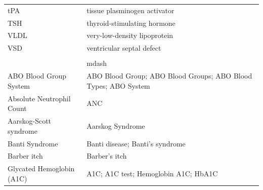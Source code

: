 \begin{longtable}{>{\raggedright\arraybackslash}p{} >{\raggedright\arraybackslash}p{}}
tPA & tissue plasminogen activator \\
TSH & thyroid-stimulating hormone \\
VLDL & very-low-density lipoprotein \\
VSD & ventricular septal defect\\\\&mdash \\
ABO Blood Group System & ABO Blood Group; ABO Blood Groups; ABO Blood Types; ABO System \\
Absolute Neutrophil Count & ANC \\
Aarskog-Scott syndrome & Aarskog Syndrome \\
Banti Syndrome & Banti disease; Banti's syndrome \\
Barber itch & Barber's itch \\
Glycated Hemoglobin (A1C) & A1C; A1C test; Hemoglobin A1C; HbA1C \\
\end{longtable}
